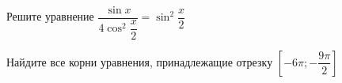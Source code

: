 \begin{ex}
	\begin{condition}
		\begin{enumcols}[label=\asbuk*)]
			\item Решите уравнение \( \dfrac{\sin  x}{4 \cos^2 \dfrac{x}{2}} = \sin^2 \dfrac{x}{2} \)
			\item Найдите все корни уравнения, принадлежащие отрезку \(  \left[-6\pi;-\dfrac{9\pi}{2}\right] \)
		\end{enumcols}
	\end{condition}
\end{ex}
